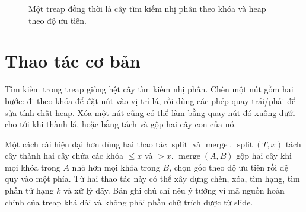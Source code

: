 \documentclass[11pt]{article}
\begin{document}
\begin{figure}[ht]
\centering
{}
\caption{Một treap đồng thời là cây tìm kiếm nhị phân theo khóa và heap theo độ ưu tiên.}
\end{figure}

\section{Thao tác cơ bản}

Tìm kiếm trong treap giống hệt cây tìm kiếm nhị phân. Chèn một nút gồm hai
bước: đi theo khóa để đặt nút vào vị trí lá, rồi dùng các phép quay trái/phải
để sửa tính chất heap. Xóa một nút cũng có thể làm bằng quay nút đó xuống dưới
cho tới khi thành lá, hoặc bằng tách và gộp hai cây con của nó.

Một cách cài hiện đại hơn dùng hai thao tác \(\operatorname{split}\) và
\(\operatorname{merge}\). \(\operatorname{split}(T,x)\) tách cây thành hai
cây chứa các khóa \(\le x\) và \(>x\). \(\operatorname{merge}(A,B)\) gộp hai
cây khi mọi khóa trong \(A\) nhỏ hơn mọi khóa trong \(B\), chọn gốc theo độ ưu
tiên rồi đệ quy vào một phía. Từ hai thao tác này có thể xây dựng chèn, xóa,
tìm hạng, tìm phần tử hạng \(k\) và xử lý dãy. Bản ghi chú chỉ nêu ý tưởng vì
mã nguồn hoàn chỉnh của treap khá dài và không phải phần chữ trích được từ
slide.
\end{document}
